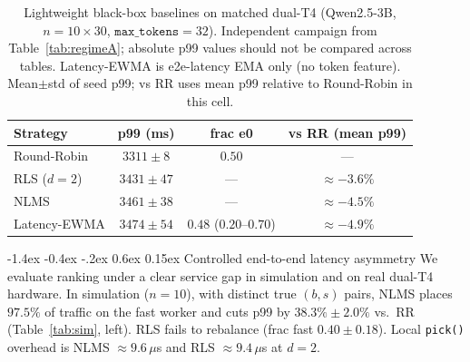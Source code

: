\documentclass[pdflatex,sn-mathphys-num]{sn-jnl}
\makeatletter
\renewcommand{\subsection}{\@startsection{subsection}{2}{\z@}%
  {-1.4ex \@plus -0.4ex \@minus -.2ex}%
  {0.6ex \@plus 0.15ex}%
  {\normalfont\normalsize\bfseries}}%
\makeatother
\begin{document}
\begin{table}[ht]
\caption{Lightweight black-box baselines on matched dual-T4
(Qwen2.5-3B, $n{=}10\times 30$, $\texttt{max\_tokens}{=}32$). Independent campaign
from Table~\ref{tab:regimeA}; absolute p99 values should not be compared across
tables. Latency-EWMA is e2e-latency EMA only (no token feature).
Mean$\pm$std of seed p99; vs RR uses mean p99 relative to Round-Robin in this cell.}
\label{tab:ewma-matched}
\centering
\footnotesize
\begin{tabular}{@{}lccc@{}}
\toprule
Strategy & p99 (ms) & frac e0 & vs RR (mean p99) \\
\midrule
Round-Robin & $3311\pm8$ & $0.50$ & --- \\
RLS ($d{=}2$) & $3431\pm47$ & --- & $\approx{-}3.6\%$ \\
NLMS & $3461\pm38$ & --- & $\approx{-}4.5\%$ \\
Latency-EWMA & $3474\pm54$ & $0.48$ ($0.20$--$0.70$) & $\approx{-}4.9\%$ \\
\bottomrule
\end{tabular}
\end{table}

\subsection{Controlled end-to-end latency asymmetry}
\label{sec:regimeC}
We evaluate ranking under a clear service gap in simulation and on real dual-T4
hardware. In simulation ($n{=}10$), with distinct true $(b,s)$ pairs, NLMS places
$97.5\%$ of traffic on the fast worker and cuts p99 by $38.3\%\pm2.0\%$ vs.\ RR
(Table~\ref{tab:sim}, left). RLS fails to rebalance (frac fast $0.40\pm0.18$).
Local \texttt{pick()} overhead is NLMS $\approx 9.6\,\mu$s and RLS $\approx 9.4\,\mu$s
at $d{=}2$.
\end{document}
